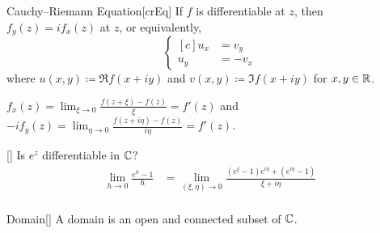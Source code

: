 \documentclass[../complex_variables_1.tex]{subfiles}
\begin{document}
\begin{Theorem}{Cauchy--Riemann Equation}[crEq]
    If \(f\) is differentiable at \(z\), then \(f_y(z) = if_x(z)\) at \(z\),
    or equivalently,
    \[
        \left\{\begin{aligned}[c]
                u_x &= v_y \\
                u_y &= -v_x
        \end{aligned}\right.
    \]
    where \(u(x, y) \coloneqq \Re f(x+iy)\) and \(v(x, y) \coloneqq \Im f(x+iy)\)
    for \(x, y \in \RR\).
\end{Theorem}
\begin{myproof}[Proof]
    \(\displaystyle f_x(z) = \lim_{\xi \to 0} \frac{f(z + \xi) - f(z)}{\xi} = f'(z)\) and
    \(\displaystyle -if_y(z) = \lim_{\eta \to 0} \frac{f(z + i\eta) - f(z)}{i\eta} = f'(z)\).
\end{myproof}

\begin{Example}{}[]
    Is \(e^z\) differentiable in \(\CC\)?
    \begin{align*}
        \lim_{h \to 0} \frac{e^h - 1}{h}
        &= \lim_{(\xi,\eta) \to 0} \frac{(e^\xi - 1) e^{i\eta} + (e^{i\eta} - 1)}{\xi+i\eta} \\
    \end{align*}
\end{Example}


\begin{Definition}{Domain}[]
    A domain is an open and connected subset of \(\CC\).
\end{Definition}
\end{document}
